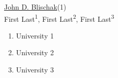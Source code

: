 

\iflatexml
  \href{https://www.authorea.com/users/5990}{John D. Blischak}(1)\\
\else
  First Last\textsuperscript{1}, First Last\textsuperscript{2}, First Last\textsuperscript{3}
\fi

\begin{enumerate}
\item University 1
\item University 2
\item University 3
\end{enumerate}

  
  